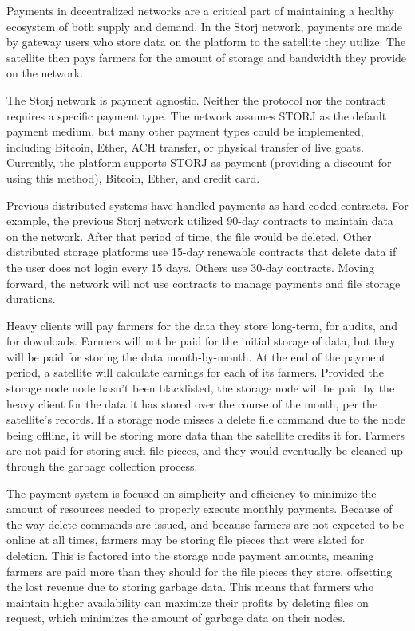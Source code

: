\documentclass[a4paper,10pt]{article} \usepackage[utf8]{inputenc}
\begin{document}
Payments in decentralized networks are a critical part of maintaining a healthy
ecosystem of both supply and demand.
In the Storj network, payments are made by gateway users who store data on the
platform to the satellite they utilize.
The satellite then pays farmers for the amount of storage and bandwidth they
provide on the network.

The Storj network is payment agnostic.
Neither the protocol nor the contract requires a specific payment type.
The network assumes STORJ as the default payment medium, but many other payment
types could be implemented, including Bitcoin, Ether, ACH transfer, or physical
transfer of live goats.
Currently, the platform supports STORJ as payment (providing a discount for
using this method), Bitcoin, Ether, and credit card.

Previous distributed systems have handled payments as hard-coded contracts.
For example, the previous Storj network utilized 90-day contracts to maintain
data on the network. After that period of time, the file would be deleted.
Other distributed storage platforms use 15-day renewable contracts that delete
data if the user does not login every 15 days. Others use 30-day contracts.
Moving forward, the network will not use contracts to manage payments and file
storage durations.

Heavy clients will pay farmers for the data they store long-term, 
for audits, and for downloads. 
Farmers will not be paid for the initial storage of data, but they
will be paid for storing the data month-by-month. At the end of the payment
period, a satellite will calculate earnings for each of its farmers. 
Provided the storage node node hasn’t been blacklisted, 
the storage node will be paid by the heavy
client for the data it has stored over the course of
the month, per the satellite's records. 
If a storage node misses a delete file command due to the node being
offline, it will be storing more data than the satellite credits it for. 
Farmers are not paid for storing such file pieces, and they
would eventually be cleaned up through the garbage collection process.

The payment system is focused on simplicity and efficiency to minimize the
amount of resources needed to properly execute monthly payments. Because of the
way delete commands are issued, and because farmers are not expected to be
online at all times, farmers may be storing file pieces that were slated for
deletion. This is factored into
the storage node payment amounts, meaning farmers are paid more than they
should for the file pieces they store, offsetting the lost revenue due to
storing garbage data. 
This means that farmers who maintain higher availability
can maximize their profits by deleting files on request,
which minimizes the amount
of garbage data on their nodes.
\end{document}
